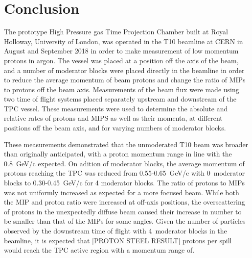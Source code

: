 \section{Conclusion}
\label{hptpcPaper:sec:conclusion}

The prototype High Pressure gas Time Projection Chamber built at Royal Holloway, University of London, was operated in the T10 beamline at CERN in August and September 2018 in order to make measurement of low momentum protons in argon.
The vessel was placed at a position off the axis of the beam, and a number of moderator blocks were placed directly in the beamline in order to reduce the average momentum of beam protons and change the ratio of MIPs to protons off the beam axis.
Measurements of the beam flux were made using two time of flight systems placed separately upstream and downstream of the TPC vessel. 
These measurements were used to determine the absolute and relative rates of protons and MIPS as well as their momenta, at different positions off the beam axis, and for varying numbers of moderator blocks.

These measurements demonstrated that the unmoderated T10 beam was broader than originally anticipated, with a proton momentum range in line with the 0.8~GeV/c expected.
On adition of moderator blocks, the average momentum of protons reaching the TPC was reduced from 0.55-0.65~GeV/c with 0~moderator blocks to 0.30-0.45~GeV/c for 4 moderator blocks.
The ratio of protons to MIPs was not uniformly increased as expected for a more focused beam. While both the MIP and proton ratio were increased at off-axis positions, the overscattering of protons in the unexpectedly diffuse beam caused their increase in number to be smaller than that of the MIPs for some angles.
Given the number of particles observed by the downstream time of flight with 4~moderator blocks in the beamline, it is expected that [PROTON STEEL RESULT] protons per spill would reach the TPC active region with a momentum range of.

